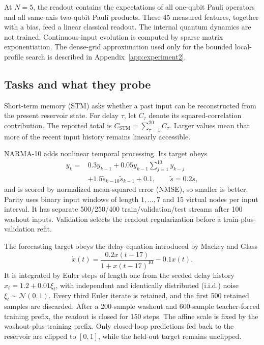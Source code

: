 At \(N=5\), the readout contains the expectations of all one-qubit Pauli
operators and all same-axis two-qubit Pauli products.  These 45 measured
features, together with a bias, feed a linear classical readout.  The internal
quantum dynamics are not trained.  Continuous-input evolution is computed by
sparse matrix exponentiation.  The dense-grid approximation used only for
the bounded local-profile search is described in
Appendix~\ref{app:experiment2}.

\subsection{Tasks and what they probe}

Short-term memory (STM) asks whether a past input can be reconstructed from
the present reservoir state. For delay \(\tau\), let \(C_\tau\) denote its
squared-correlation contribution. The reported total is
\(C_{\mathrm{STM}}=\sum_{\tau=1}^{20}C_\tau\). Larger values mean that more of
the recent input history remains linearly accessible.

NARMA-10 adds nonlinear temporal processing.  Its target obeys
\[
\begin{aligned}
y_k={}&0.3y_{k-1}+0.05y_{k-1}\sum_{j=1}^{10}y_{k-j}\\
&+1.5\tilde s_{k-10}\tilde s_{k-1}+0.1,
\qquad \tilde s=0.2s ,
\end{aligned}
\]
and is scored by normalized mean-squared error (NMSE), so smaller is better.
Parity uses binary input windows of length \(1,\ldots,7\) and 15 virtual
nodes per input interval.  It has separate 500/250/400
train/validation/test streams after 100 washout inputs.  Validation selects
the readout regularization before a train-plus-validation refit.

The forecasting target obeys the delay equation introduced by Mackey and Glass
\[
\dot x(t)=\frac{0.2x(t-17)}{1+x(t-17)^{10}}-0.1x(t).
\]
It is integrated by Euler steps of length one from the seeded delay history
\(x_t=1.2+0.01\xi_t\), with
independent and identically distributed (i.i.d.) noise
\(\xi_t\sim\mathcal N(0,1)\). Every third Euler
iterate is retained, and the first 500 retained samples are discarded. After a
200-sample washout and 600-sample teacher-forced training prefix, the readout
is closed for 150 steps.  The affine scale
is fixed by the washout-plus-training prefix.  Only closed-loop predictions
fed back to the reservoir are clipped to \([0,1]\), while the held-out target
remains unclipped.

